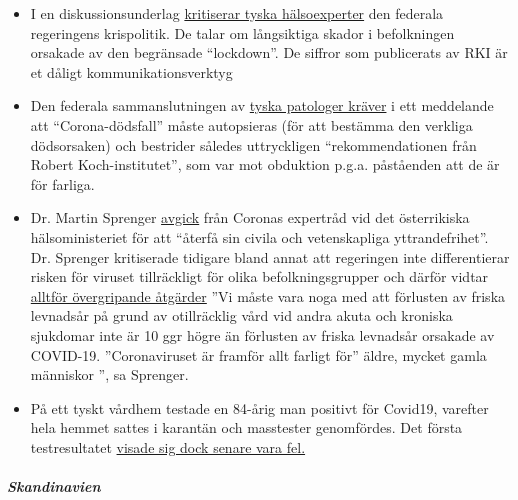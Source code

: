 \begin{itemize}
\tightlist
\item
  I en diskussionsunderlag
  \href{https://www.tagesschau.de/investigativ/ndr-wdr/corona-experten-thesenpapier-101.html}{kritiserar
  tyska hälsoexperter} den federala regeringens krispolitik. De talar om
  långsiktiga skador i befolkningen orsakade av den begränsade
  ``lockdown''. De siffror som publicerats av RKI är et dåligt
  kommunikationsverktyg
\item
  Den federala sammanslutningen av
  \href{https://www.pathologie-dgp.de/die-dgp/aktuelles/meldung/pressemitteilung-an-corona-verstorbene-sollten-obduziert-werden/}{tyska
  patologer kräver} i ett meddelande att ``Corona-dödsfall'' måste
  autopsieras (för att bestämma den verkliga dödsorsaken) och bestrider
  således uttryckligen ``rekommendationen från Robert Koch-institutet'',
  som var mot obduktion p.g.a. påståenden att de är för farliga.
\item
  Dr. Martin Sprenger
  \href{https://mailchi.mp/addendum/fles-home-office-260342}{avgick}
  från Coronas expertråd vid det österrikiska hälsoministeriet för att
  ``återfå sin civila och vetenskapliga yttrandefrihet''. Dr. Sprenger
  kritiserade tidigare bland annat att regeringen inte differentierar
  risken för viruset tillräckligt för olika befolkningsgrupper och
  därför vidtar
  \href{https://www.addendum.org/coronavirus/interview-sprenger/}{alltför
  övergripande åtgärder} ''Vi måste vara noga med att förlusten av
  friska levnadsår på grund av otillräcklig vård vid andra akuta och
  kroniska sjukdomar inte är 10 ggr högre än förlusten av friska
  levnadsår orsakade av COVID-19. ''Coronaviruset är framför allt
  farligt för'' äldre, mycket gamla människor '', sa Sprenger.
\item
  På ett tyskt vårdhem testade en 84-årig man positivt för Covid19,
  varefter hela hemmet sattes i karantän och masstester genomfördes. Det
  första testresultatet
  \href{https://www.schwerin.de/news/4a3e5560-78c9-11ea-b543-1967de695b51/}{visade
  sig dock senare vara fel.}
\end{itemize}

\hypertarget{skandinavien}{%
\subparagraph{\texorpdfstring{\textbf{Skandinavien}}{Skandinavien}}\label{skandinavien}}


